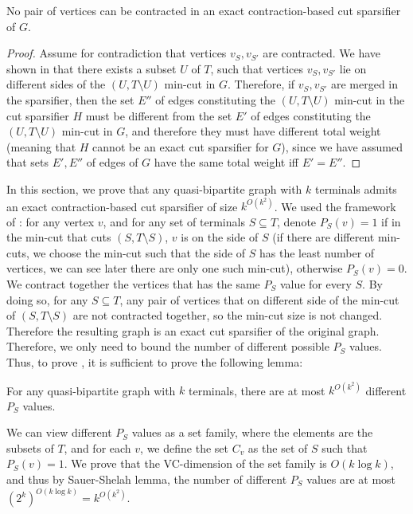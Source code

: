 \begin{claim}
No pair of vertices can be contracted in an exact contraction-based cut sparsifier of $G$.
\end{claim}
\begin{proof}
Assume for contradiction that vertices $v_S,v_{S'}$ are contracted. We have shown in  that there exists a subset $U$ of $T$, such that vertices $v_S,v_{S'}$ lie on different sides of the $(U,T\setminus U)$ min-cut in $G$.
Therefore, if $v_S,v_{S'}$ are merged in the sparsifier, then the set $E''$ of edges constituting the $(U,T\setminus U)$ min-cut in the cut sparsifier $H$ must be different from the set $E'$ of edges constituting the $(U,T\setminus U)$ min-cut in $G$, and therefore they must have different total weight (meaning that $H$ cannot be an exact cut sparsifier for $G$), since we have assumed that sets $E',E''$ of edges of $G$ have the same total weight iff $E'=E''$.
\end{proof}









\iffalse
In this section, we prove that any quasi-bipartite graph with $k$ terminals admits an exact contraction-based cut sparsifier of size $k^{O(k^2)}$. We used the framework of \cite{khan2014mimicking}: for any vertex $v$, and for any set of terminals $S \subseteq T$, denote $P_S(v)=1$ if in the min-cut that cuts $(S,T \setminus S)$, $v$ is on the side of $S$ (if there are different min-cuts, we choose the min-cut such that the side of $S$ has the least number of vertices, we can see later there are only one such min-cut), otherwise $P_S(v)=0$. We contract together the vertices that has the same $P_S$ value for every $S$. By doing so, for any $S \subseteq T$, any pair of vertices that on different side of the min-cut of $(S, T \setminus S)$ are not contracted together, so the min-cut size is not changed. Therefore the resulting graph is an exact cut sparsifier of the original graph. Therefore, we only need to bound the number of different possible $P_S$ values. Thus, to prove , it is sufficient to prove the following lemma:

\begin{lemma} \label{quasi_profile}
    For any quasi-bipartite graph with $k$ terminals, there are at most $k^{O(k^2)}$ different $P_S$ values.
\end{lemma}

We can view different $P_S$ values as a set family, where the elements are the subsets of $T$, and for each $v$, we define the set $C_v$ as the set of $S$ such that $P_S(v)=1$. We prove that the VC-dimension of the set family is $O(k \log k)$, and thus by Sauer-Shelah lemma, the number of different $P_S$ values are at most $(2^k)^{O(k \log k)} = k^{O(k^2)}$.  

